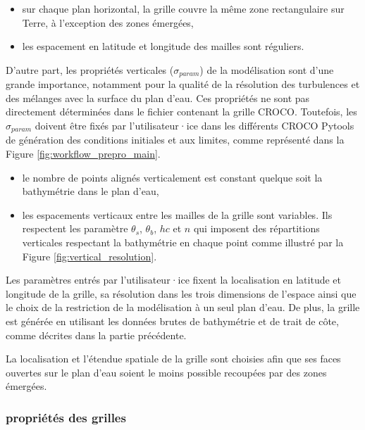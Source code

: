 \documentclass[10pt,a4paper,titlepage]{article}
\begin{document}
\begin{itemize}
    \item sur chaque plan horizontal, la grille couvre la même zone rectangulaire sur Terre, à l'exception des zones émergées,
    \item les espacement en latitude et longitude des mailles sont réguliers.
\end{itemize}

D'autre part, les propriétés verticales ($\sigma_{param}$) de la modélisation sont d'une grande importance, notamment pour la qualité de la résolution des turbulences et des mélanges avec la surface du plan d'eau.
Ces propriétés ne sont pas directement déterminées dans le fichier contenant la grille CROCO.
Toutefois, les $\sigma_{param}$ doivent être fixés par l'utilisateur·ice dans les différents CROCO Pytools de génération des conditions initiales et aux limites, comme représenté dans la Figure \ref{fig:workflow_prepro_main}.

\begin{itemize}
    \item le nombre de points alignés verticalement est constant quelque soit la bathymétrie dans le plan d'eau,
    \item les espacements verticaux entre les mailles de la grille sont variables. Ils respectent les paramètre $\theta_s$, $\theta_b$, $hc$ et $n$ qui imposent des répartitions verticales respectant la bathymétrie en chaque point comme illustré par la Figure \ref{fig:vertical_resolution}.
\end{itemize}


Les paramètres entrés par l'utilisateur·ice fixent la localisation en latitude et longitude de la grille, sa résolution dans les trois dimensions de l'espace ainsi que le choix de la restriction de la modélisation à un seul plan d'eau.
De plus, la grille est générée en utilisant les données brutes de bathymétrie et de trait de côte, comme décrites dans la partie précédente.

La localisation et l'étendue spatiale de la grille sont choisies afin que ses faces ouvertes sur le plan d'eau soient le moins possible recoupées par des zones émergées.


\subsubsection{propriétés des grilles}
\label{subsub:propriete_gilles_ADCL}
\end{document}
